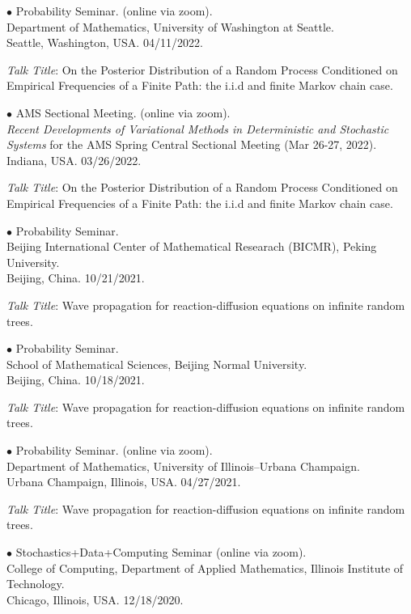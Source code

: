 \documentclass[margin,line]{res}
\begin{document}
\begin{resume}
{$\bullet$ Probability Seminar. (online via zoom). \\ Department of Mathematics, University of Washington at Seattle. \\
Seattle, Washington, USA.} \hfill 04/11/2022.

\textit{Talk Title}: On the Posterior Distribution of a Random Process Conditioned on Empirical Frequencies of a Finite Path: the i.i.d and finite Markov chain case.


{$\bullet$ AMS Sectional Meeting. (online via zoom). \\ 
\textit{Recent Developments of Variational Methods in Deterministic and Stochastic Systems} for the AMS Spring Central Sectional Meeting (Mar 26-27, 2022). \\
Indiana, USA.} \hfill 03/26/2022.

\textit{Talk Title}: On the Posterior Distribution of a Random Process Conditioned on Empirical Frequencies of a Finite Path: the i.i.d and finite Markov chain case.


{$\bullet$ Probability Seminar. \\ Beijing International Center of Mathematical Researach (BICMR), Peking University. \\
Beijing, China.} \hfill 10/21/2021.

\textit{Talk Title}: Wave propagation for reaction-diffusion equations on infinite random trees.

{$\bullet$ Probability Seminar. \\ School of Mathematical Sciences, Beijing Normal University. \\
Beijing, China.} \hfill 10/18/2021.

\textit{Talk Title}: Wave propagation for reaction-diffusion equations on infinite random trees.

{$\bullet$ Probability Seminar. (online via zoom). \\ Department of Mathematics, University of Illinois--Urbana Champaign. \\
Urbana Champaign, Illinois, USA.} \hfill 04/27/2021.

\textit{Talk Title}: Wave propagation for reaction-diffusion equations on infinite random trees.

{$\bullet$ Stochastics+Data+Computing Seminar (online via zoom). \\ College of Computing, Department of Applied Mathematics,
Illinois Institute of Technology. \\
Chicago, Illinois, USA.} \hfill 12/18/2020.


\end{resume}
\end{document}

